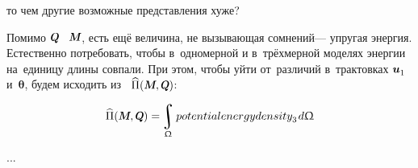 \begin{otherlanguage}{russian}
\vspace{-0.2em}\noindent
то чем другие возможные представления хуже?

Помимо $\internalforce$ ~$\internalmoment$, есть ещё величина, не вызывающая сомнений\:--- упругая энергия.
Естественно потребовать, чтобы в~одно\-мерной и в~трёх\-мерной моделях энергии на~единицу длины совпали.
При этом, чтобы уйти от~различий в~трактовках ${\bm{u}_{\raisemath{-0.2ex}{1}}}$ и~$\bm{\theta}$, будем исходить из ~${\widehat{\potentialenergydensity}(\internalmoment, \internalforce)}$:

\nopagebreak\vspace{-0.1em}\begin{equation*}
\widehat{\potentialenergydensity}(\internalmoment, \internalforce) = \hspace{-0.2ex} \integral\displaylimits_{\rodsection} \hspace{-0.4ex} \\potentialenergydensity_{\raisemath{-0.2ex}{3}} \hspace{.2ex} d\rodsection
\end{equation*}

...

\end{otherlanguage}



\label{section:variationalmethodforonedimension}

